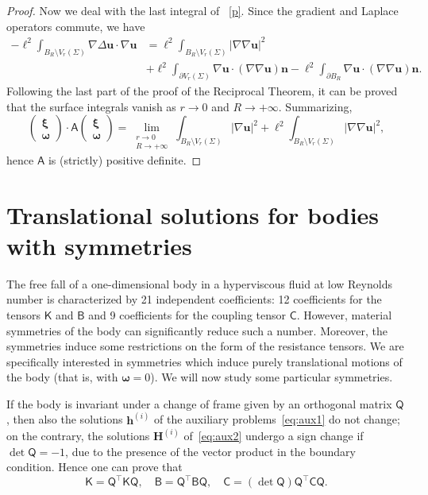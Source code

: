 \documentclass[final]{amsart}
\theoremstyle{definition}
\theoremstyle{definition}
\theoremstyle{remark}
\begin{document}
\begin{proof}
Now we deal with the last integral of ~\eqref{p}.  Since the gradient
and Laplace operators commute, we have
\begin{align*}
-\ell^2\int_{B_R\setminus V_r({\Sigma})}\nabla{\Delta}{\boldsymbol u}\cdot \nabla{\boldsymbol u} & = \ell^2\int_{B_R\setminus V_r({\Sigma})}|\nabla\nabla{\boldsymbol u}|^2\\
& + \ell^2 \int_{{\partial} {V_r({\Sigma})}}\nabla{\boldsymbol u}\cdot(\nabla\nabla{\boldsymbol u}){\boldsymbol n}
- \ell^2\int_{{\partial} B_R}\nabla{\boldsymbol u}\cdot(\nabla\nabla{\boldsymbol u}){\boldsymbol n}.
\end{align*}
Following the last part of the proof of the Reciprocal Theorem, it can
be proved that the surface integrals vanish as $r\to 0$ and $R\to
+\infty$. Summarizing,
\[
\begin{pmatrix}{\boldsymbol \xi}\\ {\boldsymbol \omega}\end{pmatrix}\cdot
{\mathsf A} \begin{pmatrix}{\boldsymbol \xi}\\ {\boldsymbol \omega}\end{pmatrix}
=\lim_{\substack{r\to 0\\ R\to+\infty}}\int_{B_R\setminus V_r({\Sigma})}|\nabla{\boldsymbol u}|^2 + 
\ell^2\int_{B_R\setminus V_r({\Sigma})}|\nabla\nabla{\boldsymbol u}|^2,
\]
hence ${\mathsf A}$ is (strictly) positive definite.
\end{proof}

\section{Translational solutions for bodies with symmetries}
\label{sec:sym}

The free fall of a one-dimensional body in a hyperviscous fluid at low
Reynolds number is characterized by 21 independent coefficients: 12
coefficients for the tensors ${\mathsf K}$ and ${\mathsf B}$ and 9 coefficients
for the coupling tensor ${\mathsf C}$. However, material symmetries of the
body can significantly reduce such a number. Moreover, the symmetries
induce some restrictions on the form of the resistance tensors. We are
specifically interested in symmetries which induce purely
translational motions of the body (that is, with ${\boldsymbol \omega}=0$). We will
now study some particular symmetries.

If the body is invariant under a change of frame given by an
orthogonal matrix ${\mathsf Q}$, then also the solutions ${\boldsymbol h}^{(i)}$ of
the auxiliary problems~\eqref{eq:aux1} do not change; on the contrary,
the solutions ${\boldsymbol H}^{(i)}$ of~\eqref{eq:aux2}
undergo a sign change if $\det {\mathsf Q}=-1$, due to the presence of the
vector product in the boundary condition. Hence one can prove that
\begin{equation}
\label{eq:change}
{\mathsf K}={\mathsf Q}^{\intercal} {\mathsf K} {\mathsf Q},\quad 
{\mathsf B}={\mathsf Q}^{\intercal} {\mathsf B} {\mathsf Q},\quad
{\mathsf C}=(\det{\mathsf Q}){\mathsf Q}^{\intercal} {\mathsf C} {\mathsf Q}.
\end{equation}
\end{document}

